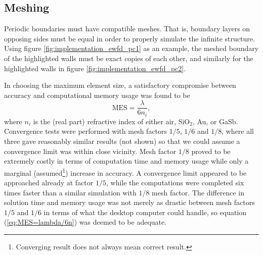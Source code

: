 \subsection{Meshing}
\label{sec:implementation_meshing}
Periodic boundaries must have compatible meshes. That is, boundary layers on opposing sides must be equal in order to properly simulate the infinite structure. Using figure \ref{fig:implementation_ewfd_pc1} as an example, the meshed boundary of the highlighted walls must be exact copies of each other, and similarly for the highlighted walls in figure \ref{fig:implementation_ewfd_pc2}. 

In choosing the maximum element size, a satisfactory compromise between accuracy and computational memory usage was found to be 
\begin{equation}
    \text{MES} = \frac{\lambda}{6n_i},
    \label{eq:MES=lambda/6n}
\end{equation}
where $n_i$ is the (real part) refractive index of either air, SiO$_2$, Au, or GaSb. Convergence tests were performed with mesh factors $1/5$, $1/6$ and $1/8$, where all three gave reasonably similar results (not shown) so that we could assume a convergence limit was within close vicinity. Mesh factor $1/8$ proved to be extremely costly in terms of computation time and memory usage while only a marginal (assumed\footnote{Converging result does not always mean correct result.}) increase in accuracy. A convergence limit appeared to be approached already at factor $1/5$, while the computations were completed six times faster than a similar simulation with $1/8$ mesh factor. The difference in solution time and memory usage was not merely as drastic between mesh factors $1/5$ and $1/6$ in terms of what the desktop computer could handle, so equation (\ref{eq:MES=lambda/6n}) was deemed to be adequate.


